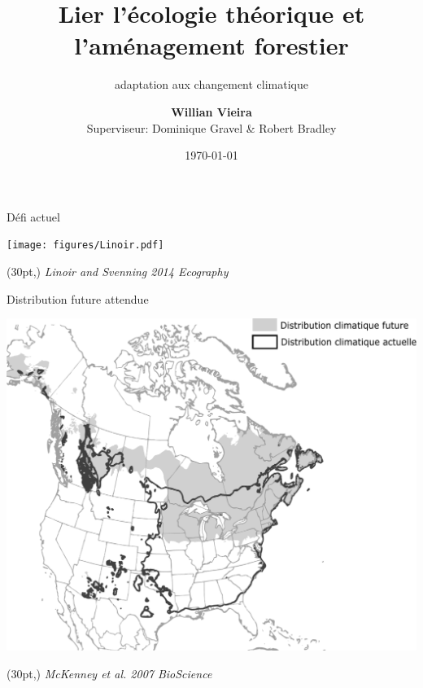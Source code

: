 \documentclass[11pt, compress, aspectratio=1610]{beamer}
\title{Lier l'écologie théorique et l'aménagement forestier}
\subtitle{adaptation aux changement climatique}
\date{\today}
\author{\textbf{Willian Vieira}\\
Superviseur: Dominique Gravel \& Robert Bradley \newline}
\institute{}
\newcommand\smallcitation[1]{%
\begin{textblock*}{\textwidth}(30pt,\textheight)
	\raggedleft \footnotesize\textit{#1}
\end{textblock*}}
\let\OldTexttt\texttt
\renewcommand{\texttt}[1]{\OldTexttt{\color{plTT}#1}}
\begin{document}
\maketitle

\begin{frame}{Défi actuel}

\centering
 \texttt{[image: figures/Linoir.pdf]}\par

\smallcitation{Linoir and Svenning 2014 Ecography}

\end{frame}

\begin{frame}{Distribution future attendue}

\centering
 \includegraphics[scale=0.4]{figures/mckenney.pdf}\par

\smallcitation{McKenney et al. 2007 BioScience}

\end{frame}
\end{document}
